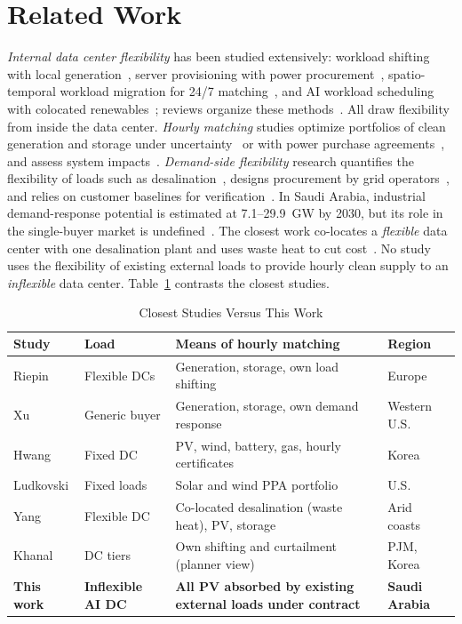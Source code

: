 \documentclass[conference]{IEEEtran}
\begin{document}
\section{Related Work}
\emph{Internal data center flexibility} has been studied extensively: workload shifting with local generation~\cite{r2}, server provisioning with power procurement~\cite{r5}, spatio-temporal workload migration for 24/7 matching~\cite{r9}, and AI workload scheduling with colocated renewables~\cite{r8}; reviews organize these methods~\cite{r3}. All draw flexibility from inside the data center. \emph{Hourly matching} studies optimize portfolios of clean generation and storage under uncertainty~\cite{r14,r16} or with power purchase agreements~\cite{r15}, and assess system impacts~\cite{r10,r11}. \emph{Demand-side flexibility} research quantifies the flexibility of loads such as desalination~\cite{r19,r20}, designs procurement by grid operators~\cite{r18}, and relies on customer baselines for verification~\cite{r17}. In Saudi Arabia, industrial demand-response potential is estimated at 7.1--29.9~GW by 2030, but its role in the single-buyer market is undefined~\cite{r23}. The closest work co-locates a \emph{flexible} data center with one desalination plant and uses waste heat to cut cost~\cite{r22}. No study uses the flexibility of existing external loads to provide hourly clean supply to an \emph{inflexible} data center. Table~\ref{tab:lit} contrasts the closest studies.

\begin{table}[!t]
\centering
\caption{Closest Studies Versus This Work}
\label{tab:lit}
\footnotesize
\setlength{\tabcolsep}{3pt}
\begin{tabular}{@{}p{1.55cm}p{1.45cm}p{3.35cm}p{1.2cm}@{}}
\toprule
Study & Load & Means of hourly matching & Region \\
\midrule
Riepin \cite{r9} & Flexible DCs & Generation, storage, own load shifting & Europe \\
Xu \cite{r10} & Generic buyer & Generation, storage, own demand response & Western U.S. \\
Hwang \cite{r14} & Fixed DC & PV, wind, battery, gas, hourly certificates & Korea \\
Ludkovski \cite{r16} & Fixed loads & Solar and wind PPA portfolio & U.S. \\
Yang \cite{r22} & Flexible DC & Co-located desalination (waste heat), PV, storage & Arid coasts \\
Khanal \cite{r27} & DC tiers & Own shifting and curtailment (planner view) & PJM, Korea \\
\midrule
\textbf{This work} & \textbf{Inflexible AI DC} & \textbf{All PV absorbed by existing external loads under contract} & \textbf{Saudi Arabia} \\
\bottomrule
\end{tabular}
\end{table}
\end{document}

